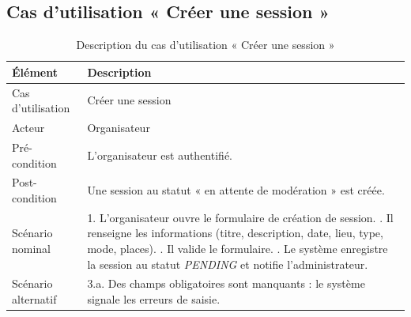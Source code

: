 \documentclass[12pt,a4paper,oneside]{report}
\begin{document}
\subsection{Cas d'utilisation « Créer une session »}
\begin{table}[H]\centering\renewcommand{\arraystretch}{1.25}
\begin{tabular}{|p{3.4cm}|p{10.3cm}|}\hline
\rowcolor{gray!15}\textbf{Élément} & \textbf{Description} \\ \hline
Cas d'utilisation & Créer une session \\ \hline
Acteur & Organisateur \\ \hline
Pré-condition & L'organisateur est authentifié. \\ \hline
Post-condition & Une session au statut « en attente de modération » est créée. \\ \hline
Scénario nominal &
1. L'organisateur ouvre le formulaire de création de session. \newline
2. Il renseigne les informations (titre, description, date, lieu, type, mode, places). \newline
3. Il valide le formulaire. \newline
4. Le système enregistre la session au statut \textit{PENDING} et notifie l'administrateur. \\ \hline
Scénario alternatif &
3.a. Des champs obligatoires sont manquants : le système signale les erreurs de saisie. \\ \hline
\end{tabular}
\caption{Description du cas d'utilisation « Créer une session »}\label{tab:uc-crea}
\end{table}
\end{document}
